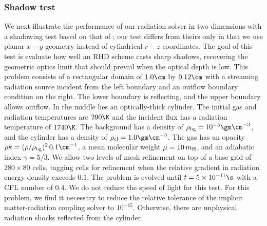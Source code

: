 \documentclass[fleqn,usenatbib]{mnras}
\begin{document}
\subsubsection{Shadow test}
\label{section:shadow_test}
We next illustrate the performance of our radiation solver in two dimensions with a shadowing test based on that of \cite{Hayes_2003}; our test differs from theirs only in that we use planar $x-y$ geometry instead of cylindrical $r-z$ coordinates. The goal of this test is evaluate how well an RHD scheme casts sharp shadows, recovering the geometric optics limit that should prevail when the optical depth is low. This problem consists of a rectangular domain of $1.0 \cm$ by $0.12 \cm$ with a streaming radiation source incident from the left boundary and an outflow boundary condition on the right. The lower boundary is reflecting, and the upper boundary allows outflow. In the middle lies an optically-thick cylinder. The initial gas and radiation temperatures are $290 \K$ and the incident flux has a radiation temperature of $1740 \K$. The background has a density of $\rho_{\text{bg}} = 10^{-3} \gm \cm^{-3}$, and the cylinder has a density of $\rho_{\text{cl}} = 1.0 \gm \cm^{-3}$. The gas has an opacity $\rho \kappa = (\rho/\rho_{\text{bg}})^2 \, 0.1 \cm^{-1}$, a mean molecular weight $\mu = 10 \, m_{\rm H}$, and an adiabatic index $\gamma = 5/3$. We allow two levels of mesh refinement on top of a base grid of $280 \times 80$ cells, tagging cells for refinement when the relative gradient in radiation energy density exceeds $0.1$. The problem is evolved until $t = 5 \times 10^{-11} \s$ with a CFL number of $0.4$. We do not reduce the speed of light for this test. For this problem, we find it necessary to reduce the relative tolerance of the implicit matter-radiation coupling solver to $10^{-15}$. Otherwise, there are unphysical radiation shocks reflected from the cylinder. 
\end{document}
